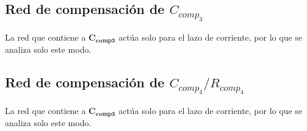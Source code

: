 \subsection{Red de compensación de $C_{comp_{3}}$}

La red que contiene a $\bm{C_{comp3}}$ actúa solo para el lazo de corriente, por lo que se analiza solo este modo.





\clearpage


\subsection{Red de compensación de $C_{comp_{4}}/R_{comp_{4}}$}

La red que contiene a $\bm{C_{comp3}}$ actúa solo para el lazo de corriente, por lo que se analiza solo este modo.







\clearpage


